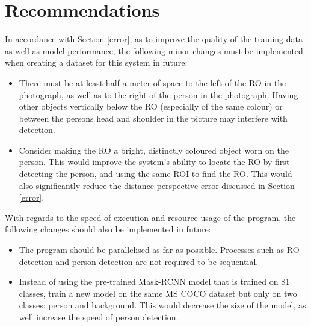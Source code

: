 \documentclass[conference]{IEEEtran}
\begin{document}
\section{Recommendations}
In accordance with Section \ref{error}, as to improve the quality of the training data as well as model performance, the following minor changes must be implemented when creating a dataset for this system in future:
\begin{itemize}
	\item There must be at least half a meter of space to the left of the RO in the photograph, as well as to the right of the person in the photograph.
	Having other objects vertically below the RO (especially of the same colour) or between the persons head and shoulder in the picture may interfere with detection.
	\item Consider making the RO a bright, distinctly coloured object worn on the person.
	This would improve the system's ability to locate the RO by first detecting the person, and using the same ROI to find the RO.
	This would also significantly reduce the distance perspective error discussed in Section \ref{error}.
\end{itemize}
With regards to the speed of execution and resource usage of the program, the following changes should also be implemented in future:
\begin{itemize}
	\item The program should be parallelised as far as possible.
	Processes such as RO detection and person detection are not required to be sequential.
	\item Instead of using the pre-trained Mask-RCNN model that is trained on 81 classes, train a new model on the same MS COCO dataset but only on two classes: person and background.
	This would decrease the size of the model, as well increase the speed of person detection.
\end{itemize}
\end{document}
